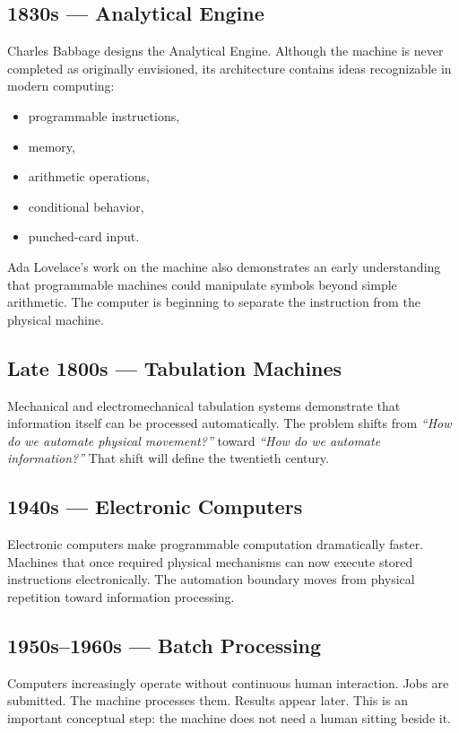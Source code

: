 \documentclass[11pt,twoside]{book}
\begin{document}
\subsection*{1830s — Analytical Engine}
Charles Babbage designs the Analytical Engine.
Although the machine is never completed as originally envisioned, its architecture contains ideas recognizable in modern computing:
\begin{itemize}[nosep]
    \item programmable instructions,
    \item memory,
    \item arithmetic operations,
    \item conditional behavior,
    \item punched-card input.
\end{itemize}
Ada Lovelace's work on the machine also demonstrates an early understanding that programmable machines could manipulate symbols beyond simple arithmetic.
The computer is beginning to separate the instruction from the physical machine.

\subsection*{Late 1800s — Tabulation Machines}
Mechanical and electromechanical tabulation systems demonstrate that information itself can be processed automatically.
The problem shifts from \emph{``How do we automate physical movement?''} toward \emph{``How do we automate information?''}
That shift will define the twentieth century.

\subsection*{1940s — Electronic Computers}
Electronic computers make programmable computation dramatically faster.
Machines that once required physical mechanisms can now execute stored instructions electronically.
The automation boundary moves from physical repetition toward information processing.

\subsection*{1950s–1960s — Batch Processing}
Computers increasingly operate without continuous human interaction.
Jobs are submitted. The machine processes them. Results appear later.
This is an important conceptual step: the machine does not need a human sitting beside it.
\end{document}

